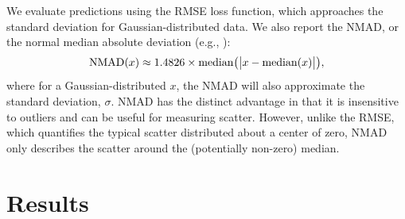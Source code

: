 \documentclass[fleqn,usenatbib]{mnras}
\newcommand{\eg}{e.g.}
\newcommand{\citeeg}[1]{(\eg, \citealt{#1})}
\begin{document}
We evaluate predictions using the RMSE loss function, which approaches the standard deviation for Gaussian-distributed data.
We also report the NMAD, or the normal median absolute deviation \citeeg{Ilbert2009, Dahlen2013, Molino2017}:
\begin{equation}
{\rm NMAD}(x) \approx 1.4826 \times {\rm median} \big (\big|x - {\rm median }(x) \big|\big ),
\end{equation}
where for a Gaussian-distributed $x$, the NMAD will also approximate the standard deviation, $\sigma$.
NMAD has the distinct advantage in that it is insensitive to outliers and can be useful for measuring scatter.
However, unlike the RMSE, which quantifies the typical scatter distributed about a center of zero, NMAD only describes the scatter around the (potentially non-zero) median.

\section{Results}\label{sec:results}
\end{document}

